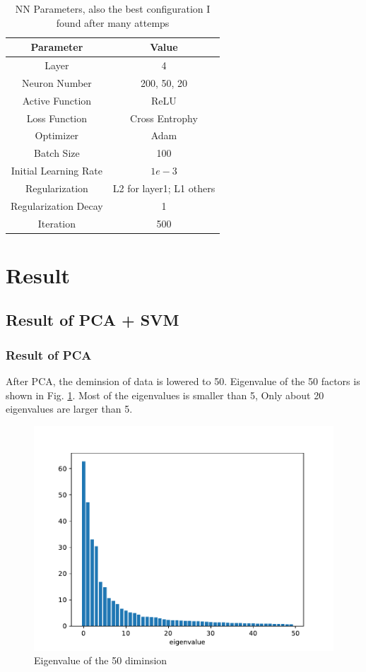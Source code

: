 \documentclass[sigchi]{acmart}
\begin{document}
\begin{table}
  \caption{NN Parameters, also the best configuration I found after many attemps}
  \label{tab:NNParameter}
  \begin{tabular}{cc}
    \toprule
    Parameter & Value \\
    \midrule
    Layer & 4 \\
    Neuron Number & 200, 50, 20 \\
    Active Function & ReLU \\
    Loss Function & Cross Entrophy\\
    Optimizer & Adam \\
    Batch Size & 100 \\
    Initial Learning Rate & $1e-3$ \\
    Regularization & L2 for layer1; L1 others \\
    Regularization Decay & 1 \\
    Iteration & 500 \\
    \bottomrule
  \end{tabular}
\end{table}

\section{Result}
\subsection{Result of PCA + SVM}
\subsubsection{Result of PCA}
After PCA, the deminsion of data is lowered to 50. Eigenvalue of the 50 factors is shown in Fig. \ref{fig:eigenvalue}. Most of the eigenvalues is smaller than 5, Only about 20 eigenvalues are larger than 5.

\begin{figure}[h]
  \centering
  \includegraphics[width=\linewidth]{figures/eigenvalue.pdf}
  \caption{Eigenvalue of the 50 diminsion}
  \label{fig:eigenvalue}
\end{figure}
\end{document}
